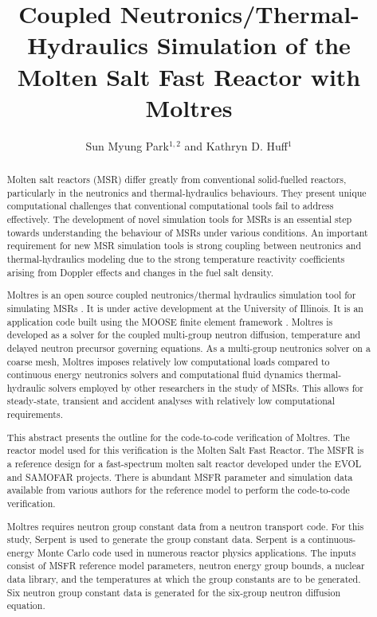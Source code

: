 \documentclass{anstrans}
\title{Coupled Neutronics/Thermal-Hydraulics Simulation of the Molten Salt Fast Reactor with Moltres}
\author{Sun Myung Park$^{1,2}$ and Kathryn D. Huff$^1$}
\institute{$^1$Dept. of Nuclear, Plasma and Radiological Engineering, University of Illinois at Urbana-Champaign \\
$^2$smpark3@illinois.edu}
\begin{document}
\begin{abstract}
Molten salt reactors (MSR) differ greatly from conventional solid-fuelled reactors, particularly in the neutronics and thermal-hydraulics behaviours. They present unique computational challenges that conventional computational tools fail to address effectively. The development of novel simulation tools for MSRs is an essential step towards understanding the behaviour of MSRs under various conditions. An important requirement for new MSR simulation tools is strong coupling between neutronics and thermal-hydraulics modeling due to the strong temperature reactivity coefficients arising from Doppler effects and changes in the fuel salt density.

Moltres is an open source coupled neutronics/thermal hydraulics simulation tool for simulating MSRs \cite{lindsay_introduction_2018}. It is under active development at the University of Illinois. It is an application code built using the MOOSE finite element framework \cite{gaston_moose:_2009}. Moltres is developed as a solver for the coupled multi-group neutron diffusion, temperature and delayed neutron precursor governing equations. As a multi-group neutronics solver on a coarse mesh, Moltres imposes relatively low computational loads compared to continuous energy neutronics solvers and computational fluid dynamics thermal-hydraulic solvers employed by other researchers in the study of MSRs. This allows for steady-state, transient and accident analyses with relatively low computational requirements.

This abstract presents the outline for the code-to-code verification of Moltres. The reactor model used for this verification is the Molten Salt Fast Reactor. The MSFR is a reference design for a fast-spectrum molten salt reactor developed under the EVOL and SAMOFAR projects\cite{serp_molten_2014}. There is abundant MSFR parameter and simulation data available from various authors \cite{fiorina_modelling_2014} \cite{pettersen_coupled_2016} for the reference model to perform the code-to-code verification.

Moltres requires neutron group constant data from a neutron transport code. For this study, Serpent is used to generate the group constant data. Serpent \cite{leppanen_serpent_2015} is a continuous-energy Monte Carlo code used in numerous reactor physics applications. The inputs consist of MSFR reference model parameters, neutron energy group bounds, a nuclear data library, and the temperatures at which the group constants are to be generated. Six neutron group constant data is generated for the six-group neutron diffusion equation.


\end{abstract}
\end{document}
